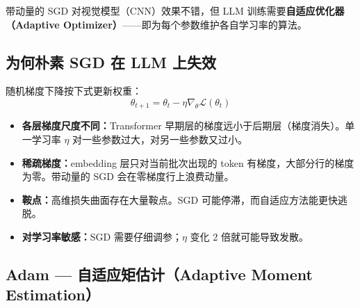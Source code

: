 带动量的 SGD 对视觉模型（CNN）效果不错，但 LLM 训练需要\textbf{自适应优化器（Adaptive Optimizer）}——即为每个参数维护各自学习率的算法。

\subsection{为何朴素 SGD 在 LLM 上失效}
\label{why-vanilla-sgd-fails-for-llms}

随机梯度下降按下式更新权重：
\[
\theta_{t+1} = \theta_t - \eta \nabla_\theta \mathcal{L}(\theta_t)
\]

\begin{warningbox}
\begin{itemize}
  \item \textbf{各层梯度尺度不同：}Transformer 早期层的梯度远小于后期层（梯度消失）。单一学习率 $\eta$ 对一些参数过大，对另一些参数又过小。
  \item \textbf{稀疏梯度：}embedding 层只对当前批次出现的 token 有梯度，大部分行的梯度为零。带动量的 SGD 会在零梯度行上浪费动量。
  \item \textbf{鞍点：}高维损失曲面存在大量鞍点。SGD 可能停滞，而自适应方法能更快逃脱。
  \item \textbf{对学习率敏感：}SGD 需要仔细调参；$\eta$ 变化 2 倍就可能导致发散。
\end{itemize}
\end{warningbox}

\subsection{Adam --- 自适应矩估计（Adaptive Moment Estimation）}
\label{adam-adaptive-moment-estimation}

